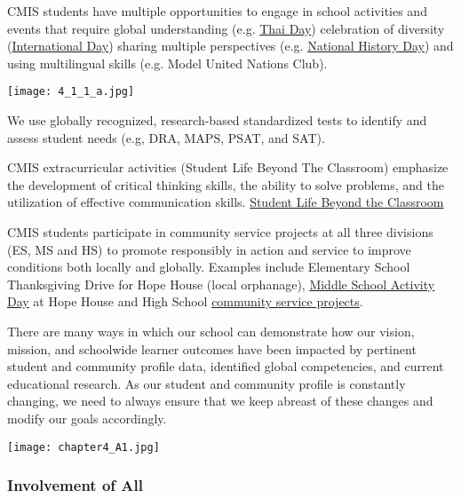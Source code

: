 \begin{findings}
CMIS students have multiple opportunities to engage in school activities and events that require global understanding (e.g. \href{http://gallery.cmis.ac.th/zp-core/full-image.php?a=2010-2011/thai-day-2011/website&i=_mg_3802-version-2.jpg&q=100&wmk=\%21&dsp=Protected\%20view&check=788a1e55c231186711f8dcc0876f4efd0daa0880}{Thai Day}) celebration of diversity (\href{http://gallery.cmis.ac.th/zp-core/full-image.php?a=2013-2014/international_day&i=_MG_6129.jpg&q=100&wmk=\%21&dsp=Protected\%20view&check=788a1e55c231186711f8dcc0876f4efd0daa0880}{International Day}) sharing multiple perspectives (e.g. \href{https://www.nhd.org/}{National History Day}) and using multilingual skills (e.g. Model United Nations Club). 

{\centering\texttt{[image: 4\_1\_1\_a.jpg]}}

We use globally recognized, research-based standardized tests to identify and assess student needs (e.g, DRA, MAPS, PSAT, and SAT). 

CMIS extracurricular activities (Student Life Beyond The Classroom) emphasize the development of critical thinking skills, the ability to solve problems, and the utilization of effective communication skills. \href{http://blogs.cmis.ac.th/eagles/}{Student Life Beyond the Classroom}

CMIS students participate in community service projects at all three divisions (ES, MS and HS) to promote responsibly in action and service to improve conditions both locally and globally. Examples include Elementary School Thanksgiving Drive for Hope House (local orphanage), \href{https://drive.google.com/a/cmis.ac.th/file/d/0B7jcj1TRcFEGNEtqR3hUSW5QVHM/view?usp=sharing}{Middle School Activity Day} at Hope House and High School \href{http://blogs.cmis.ac.th/community-service/}{community service projects}.


There are many ways in which our school can demonstrate how our vision, mission, and schoolwide learner outcomes have been impacted by pertinent student and community profile data, identified global competencies, and current educational research. 
As our student and community profile is constantly changing, we need to always ensure that we keep abreast of these changes and modify our goals accordingly.
\end{findings}

{\centering\texttt{[image: chapter4\_A1.jpg]}}

\subsubsection{Involvement of All}

